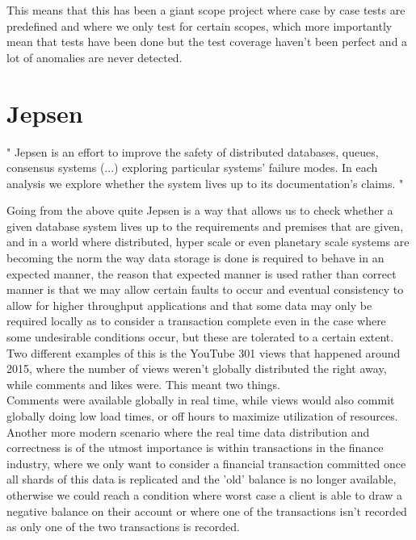 \documentclass[a4paper,10pt,titlepage]{report}
\begin{document}
    This means that this has been a giant scope project where case by case tests are predefined and where we only test for certain scopes, which more importantly mean that tests have been done but the test coverage haven't been perfect and a lot of anomalies are never detected.



    \section{Jepsen}
    "
    Jepsen is an effort to improve the safety of distributed databases, queues, consensus systems  (...) exploring particular systems' failure modes. In each analysis we explore whether the system lives up to its documentation's claims.
    "\cite{jepsonio}
    \\
    \vspace{5mm}

    Going from the above quite Jepsen is a way that allows us to check whether a given database system lives up to the requirements and premises that are given, and in a world where distributed, hyper scale or even planetary scale systems are becoming the norm the way data storage is done is required to behave in an expected manner, the reason that expected manner is used rather than correct manner is that we may allow certain faults to occur and eventual consistency to allow for higher throughput applications and that some data may only be required locally as to consider a transaction complete even in the case where some undesirable conditions occur, but these are tolerated to a certain extent. \\
    \vspace{5mm}
    Two different examples of this is the YouTube 301 views that happened around 2015, where the number of views weren't globally distributed the right away, while comments and likes were. This meant two things. \\

    Comments were available globally in real time, while views would also commit globally doing low load times, or off hours to maximize utilization of resources.\\
    \vspace{5mm}
    Another more modern scenario where the real time data distribution and correctness is of the utmost importance is within transactions in the finance industry,  where we only want to consider a financial transaction committed once all shards of this data is replicated and the 'old' balance is no longer available, otherwise we could reach a condition where worst case a client is able to draw a negative balance on their account or where one of the transactions isn't recorded as only one of the two transactions is recorded.\\
\end{document}

